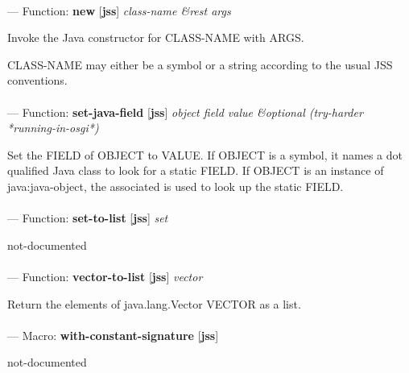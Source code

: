\paragraph{}
\label{JSS:NEW}
--- Function: \textbf{new} [\textbf{jss}] \textit{class-name \&rest args}

\begin{adjustwidth}{5em}{5em}
Invoke the Java constructor for CLASS-NAME with ARGS.

CLASS-NAME may either be a symbol or a string according to the usual JSS conventions.
\end{adjustwidth}

\paragraph{}
\label{JSS:SET-JAVA-FIELD}
--- Function: \textbf{set-java-field} [\textbf{jss}] \textit{object field value \&optional (try-harder *running-in-osgi*)}

\begin{adjustwidth}{5em}{5em}
Set the FIELD of OBJECT to VALUE.
If OBJECT is a symbol, it names a dot qualified Java class to look for
a static FIELD.  If OBJECT is an instance of java:java-object, the
associated is used to look up the static FIELD.
\end{adjustwidth}

\paragraph{}
\label{JSS:SET-TO-LIST}
--- Function: \textbf{set-to-list} [\textbf{jss}] \textit{set}

\begin{adjustwidth}{5em}{5em}
not-documented
\end{adjustwidth}

\paragraph{}
\label{JSS:VECTOR-TO-LIST}
--- Function: \textbf{vector-to-list} [\textbf{jss}] \textit{vector}

\begin{adjustwidth}{5em}{5em}
Return the elements of java.lang.Vector VECTOR as a list.
\end{adjustwidth}

\paragraph{}
\label{JSS:WITH-CONSTANT-SIGNATURE}
--- Macro: \textbf{with-constant-signature} [\textbf{jss}] \textit{}

\begin{adjustwidth}{5em}{5em}
not-documented
\end{adjustwidth}

